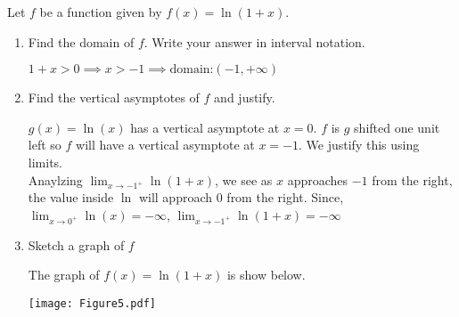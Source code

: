 \documentclass[nooutcomes, handout]{ximera}
\begin{document}
\begin{problem}
Let $f$ be a function given by $f(x)=\ln(1+x)$.

	\begin{enumerate}
	\item Find the domain of $f$.  Write your answer in interval notation.
	\begin{freeResponse}
	$1+x>0 \implies x>-1 \implies \text{domain:}(-1,+\infty)$
	\end{freeResponse}
	
	\item Find the vertical asymptotes of $f$ and justify.
	\begin{freeResponse}
	$g(x)=\ln(x)$ has a vertical asymptote at $x=0$.  $f$ is $g$ shifted one unit left so $f$ will have a vertical asymptote at $x=-1$.  We justify this using limits.\\
	Anaylzing $\lim_{x \to -1^+} \ln(1+x)$, we see as $x$ approaches $-1$ from the right, the value inside $\ln$ will approach $0$ from the right.  
	Since, $\lim_{x \to 0^+}\ln(x)=-\infty$, $\lim_{x \to -1^+} \ln(1+x)=-\infty$
	
	\end{freeResponse}

	\item Sketch a graph of $f$

	\begin{freeResponse} The graph of $f(x)=\ln(1+x)$ is show below.
  \begin{center}
    \texttt{[image: Figure5.pdf]}
  \end{center}
	\end{freeResponse}
\end{enumerate}

\end{problem}
\end{document}
